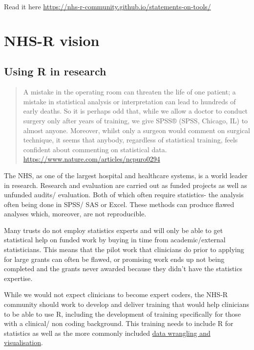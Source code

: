 \documentclass[
]{book}
\begin{document}
Read it here \url{https://nhs-r-community.github.io/statements-on-tools/}

\newpage

\hypertarget{nhs-r-vision}{%
\chapter{NHS-R vision}\label{nhs-r-vision}}

\hypertarget{using-r-in-research}{%
\section{Using R in research}\label{using-r-in-research}}

\begin{quote}
A mistake in the operating room can threaten the life of one patient; a mistake in statistical analysis or interpretation can lead to hundreds of early deaths. So it is perhaps odd that, while we allow a doctor to conduct surgery only after years of training, we give SPSS® (SPSS, Chicago, IL) to almost anyone. Moreover, whilst only a surgeon would comment on surgical technique, it seems that anybody, regardless of statistical training, feels confident about commenting on statistical data. \url{https://www.nature.com/articles/ncpuro0294}
\end{quote}

The NHS, as one of the largest hospital and healthcare systems, is a world leader in research. Research and evaluation are carried out as funded projects as well as unfunded audits/ evaluation. Both of which often require statistics- the analysis often being done in SPSS/ SAS or Excel. These methods can produce flawed analyses which, moreover, are not reproducible.

Many trusts do not employ statistics experts and will only be able to get statistical help on funded work by buying in time from academic/external statisticians. This means that the pilot work that clinicians do prior to applying for large grants can often be flawed, or promising work ends up not being completed and the grants never awarded because they didn't have the statistics expertise.

While we would not expect clinicians to become expert coders, the NHS-R community should work to develop and deliver training that would help clinicians to be able to use R, including the development of training specifically for those with a clinical/ non coding background. This training needs to include R for statistics as well as the more commonly included \href{https://github.com/nhs-r-community/intro_r}{data wrangling and visualisation}.
\end{document}
